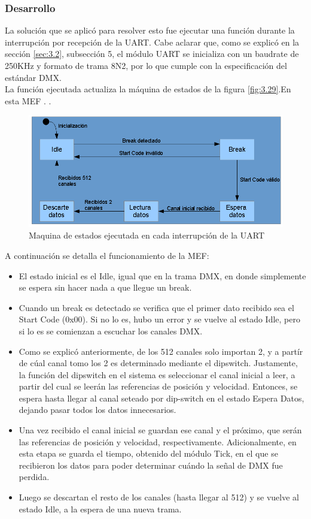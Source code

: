 \subsubsection{Desarrollo}
La solución que se aplicó para resolver esto fue ejecutar una función durante la interrupción por recepción de la UART. Cabe aclarar que, como se explicó en la sección \ref{sec:3.2}, subsección 5, el  módulo UART se inicializa con un baudrate de 250KHz y formato de trama 8N2, por lo que cumple con la especificación del estándar DMX. \\
La función ejecutada actualiza la máquina de estados de la figura \ref{fig:3.29}.En esta MEF . .  

\begin{figure}[!ht]
	\centering
	\includegraphics[width=16cm,scale=1]{resources/3_29-moduloDMXmef.png}
	\caption{Maquina de estados ejecutada en cada interrupción de la UART}
	\label{fig:\thefigure}
\end{figure}

A continuación se detalla el funcionamiento de la MEF:
\begin{itemize}
	\item El estado inicial es el Idle, igual que en la trama DMX, en donde simplemente se espera sin hacer nada a que llegue un break.
	\item Cuando un break es detectado se verifica que el primer dato recibido sea el Start Code (0x00). Si no lo es, hubo un error y se vuelve al estado Idle, pero si lo es se comienzan a escuchar los canales DMX.
	\item Como se explicó anteriormente, de los 512 canales solo importan 2, y a partír de cúal canal tomo los 2 es determinado mediante el dipswitch. Justamente, la función del dipswitch en el sistema es seleccionar el canal inicial a leer, a partir del cual se leerán las referencias de posición y velocidad. Entonces, se espera hasta llegar al canal seteado por dip-switch en el estado Espera Datos, dejando pasar todos los datos innecesarios.
	\item Una vez recibido el canal inicial se guardan ese canal y el próximo, que serán las referencias de posición y velocidad, respectivamente. Adicionalmente, en esta etapa se guarda el tiempo, obtenido del módulo Tick, en el que se recibieron los datos para poder determinar cuándo la señal de DMX fue perdida.
	\item Luego se descartan el resto de los canales (hasta llegar al 512) y se vuelve al estado Idle, a la espera de una nueva trama.
\end{itemize}

